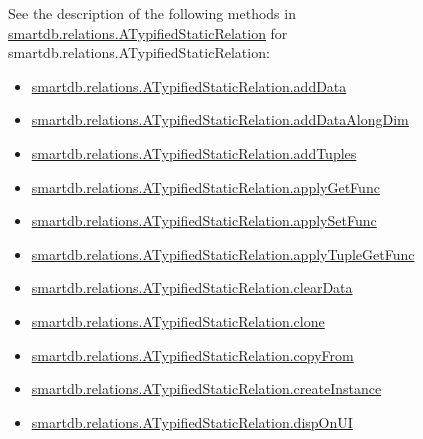 \documentclass[letterpaper,10pt,english]{sphinxmanual}
\begin{document}
See the description of the following methods in {\hyperref[chap_functions:smartdb-relations-atypifiedstaticrelation]{smartdb.relations.ATypifiedStaticRelation}} for smartdb.relations.ATypifiedStaticRelation:
\begin{itemize}
\item {} 
{\hyperref[chap_functions:smartdb-relations-atypifiedstaticrelation-adddata]{smartdb.relations.ATypifiedStaticRelation.addData}}

\item {} 
{\hyperref[chap_functions:smartdb-relations-atypifiedstaticrelation-adddataalongdim]{smartdb.relations.ATypifiedStaticRelation.addDataAlongDim}}

\item {} 
{\hyperref[chap_functions:smartdb-relations-atypifiedstaticrelation-addtuples]{smartdb.relations.ATypifiedStaticRelation.addTuples}}

\item {} 
{\hyperref[chap_functions:smartdb-relations-atypifiedstaticrelation-applygetfunc]{smartdb.relations.ATypifiedStaticRelation.applyGetFunc}}

\item {} 
{\hyperref[chap_functions:smartdb-relations-atypifiedstaticrelation-applysetfunc]{smartdb.relations.ATypifiedStaticRelation.applySetFunc}}

\item {} 
{\hyperref[chap_functions:smartdb-relations-atypifiedstaticrelation-applytuplegetfunc]{smartdb.relations.ATypifiedStaticRelation.applyTupleGetFunc}}

\item {} 
{\hyperref[chap_functions:smartdb-relations-atypifiedstaticrelation-cleardata]{smartdb.relations.ATypifiedStaticRelation.clearData}}

\item {} 
{\hyperref[chap_functions:smartdb-relations-atypifiedstaticrelation-clone]{smartdb.relations.ATypifiedStaticRelation.clone}}

\item {} 
{\hyperref[chap_functions:smartdb-relations-atypifiedstaticrelation-copyfrom]{smartdb.relations.ATypifiedStaticRelation.copyFrom}}

\item {} 
{\hyperref[chap_functions:smartdb-relations-atypifiedstaticrelation-createinstance]{smartdb.relations.ATypifiedStaticRelation.createInstance}}

\item {} 
{\hyperref[chap_functions:smartdb-relations-atypifiedstaticrelation-disponui]{smartdb.relations.ATypifiedStaticRelation.dispOnUI}}


\end{itemize}
\end{document}
